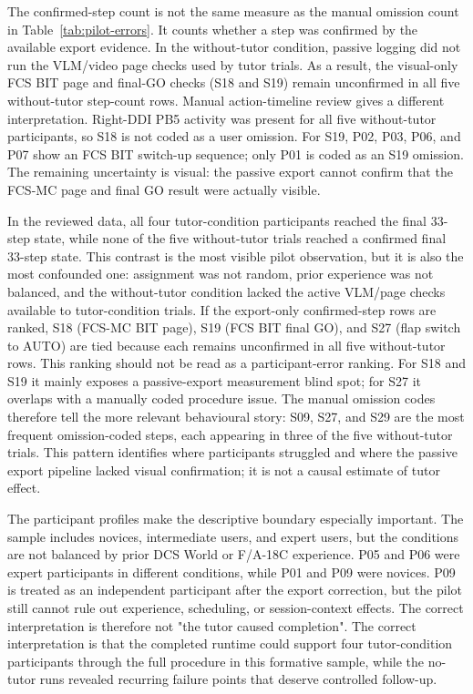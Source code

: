 The confirmed-step count is not the same measure as the manual omission count
in Table~\ref{tab:pilot-errors}. It counts whether a step was confirmed by the
available export evidence. In the without-tutor condition, passive logging did
not run the VLM/video page checks used by tutor trials. As a result, the
visual-only FCS BIT page and final-GO checks (S18 and S19) remain unconfirmed
in all five without-tutor step-count rows. Manual action-timeline review gives
a different interpretation. Right-DDI PB5 activity was present for all five
without-tutor participants, so S18 is not coded as a user omission. For S19,
P02, P03, P06, and P07 show an FCS BIT switch-up sequence; only P01 is coded
as an S19 omission. The remaining uncertainty is visual: the passive export
cannot confirm that the FCS-MC page and final GO result were actually visible.

In the reviewed data, all four tutor-condition participants reached the final
33-step state, while none of the five without-tutor trials reached a confirmed
final 33-step state. This contrast is the most visible pilot observation, but
it is also the most confounded one: assignment was not random, prior experience
was not balanced, and the without-tutor condition lacked the active VLM/page
checks available to tutor-condition trials. If the export-only confirmed-step
rows are ranked, S18 (FCS-MC BIT page), S19 (FCS BIT final GO), and S27 (flap
switch to AUTO) are tied because each remains unconfirmed in all five
without-tutor rows. This
ranking should not be read as a participant-error ranking. For S18 and S19 it
mainly exposes a passive-export measurement blind spot; for S27 it overlaps
with a manually coded procedure issue. The manual omission codes therefore tell
the more relevant behavioural story: S09, S27, and S29 are the most frequent
omission-coded steps, each appearing in three of the five without-tutor trials.
This pattern identifies
where participants struggled and where the passive export pipeline lacked
visual confirmation; it is not a causal estimate of tutor effect.

The participant profiles make the descriptive boundary especially important.
The sample includes novices, intermediate users, and expert users, but the
conditions are not balanced by prior DCS World or F/A-18C experience. P05 and
P06 were expert participants in different conditions, while P01 and P09 were
novices. P09 is treated as an independent participant after the export
correction, but the pilot still cannot rule out experience, scheduling, or
session-context effects. The correct interpretation is therefore not "the tutor
caused completion". The correct interpretation is that the completed runtime
could support four tutor-condition participants through the full procedure in
this formative sample, while the no-tutor runs revealed recurring failure
points that deserve controlled follow-up.

